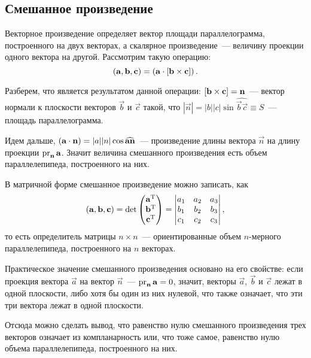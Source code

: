 \subsection{Смешанное произведение}
	Векторное произведение определяет вектор площади параллелограмма, построенного на двух векторах, а скалярное произведение~--- величину проекции одного вектора на другой. Рассмотрим такую операцию:
	\begin{equation}
		\left( \mathbf{a}, \mathbf{b}, \mathbf{c} \right) = \left(\mathbf{a} \cdot \mathbf{\left[\mathbf{b} \times \mathbf{c}\right]}\right).
	\end{equation}
	
	Разберем, что является результатом данной операции: $\left[\mathbf{b} \times \mathbf{c}\right] = \mathbf{n}$~--- вектор нормали к плоскости векторов $\vec{b}$ и $\vec{c}$ такой, что $|\vec{n}| = |b||c| \sin \widehat{\vec{b}\vec{c}} \equiv S$~--- площадь параллелограмма.
	
	Идем дальше, $\left(\mathbf{a} \cdot \mathbf{n}\right) = |a||n|\cos \widehat{\mathbf{a} \mathbf{n}}$~--- произведение длины вектора $\vec{n}$ на длину проекции $\operatorname{pr}_{\mathbf{n}} \mathbf{a}$. Значит величина смешанного произведения есть объем параллелепипеда, построенного на них.
	
	В матричной форме смешанное произведение можно записать, как
	\begin{equation}
		\left( \mathbf{a}, \mathbf{b}, \mathbf{c} \right) = \det
		\begin{pmatrix}
			\mathbf{a}^{\operatorname{T}}\\
			\mathbf{b}^{\operatorname{T}}\\
			\mathbf{c}^{\operatorname{T}}
		\end{pmatrix} = 
		\begin{vmatrix}
			a_1 & a_2 & a_3\\
			b_1 & b_2 & b_3\\
			c_1 & c_2 & c_3
		\end{vmatrix},
	\end{equation}
	то есть определитель матрицы $n \times n$~--- ориентированные объем $n$-мерного параллелепипеда, построенного на $n$ векторах.
	
	Практическое значение смешанного произведения основано на его свойстве: если проекция вектора $\vec{a}$ на вектор $\vec{n}$~--- $\operatorname{pr}_{\mathbf{n}} \mathbf{a} = 0$, значит, векторы $\vec{a}$, $\vec{b}$ и $\vec{c}$ лежат в одной плоскости, либо хотя бы один из них нулевой, что также означает, что эти три вектора лежат в одной плоскости.
	
	 Отсюда можно сделать вывод, что равенство нулю смешанного произведения трех векторов означает из компланарность или, что тоже самое, равенство нулю объема параллелепипеда, построенного на них.